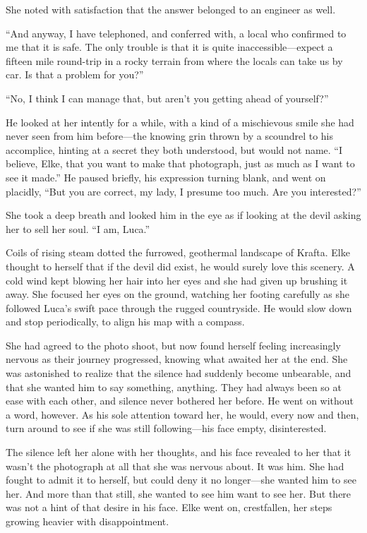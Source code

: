 She noted with satisfaction that the answer belonged to an engineer as well.

``And anyway, I have telephoned, and conferred with, a local who confirmed to me that it is safe. The only trouble is that it is quite inaccessible---expect a fifteen mile round-trip in a rocky terrain from where the locals can take us by car. Is that a problem for you?''

``No, I think I can manage that, but aren't you getting ahead of yourself?''

He looked at her intently for a while, with a kind of a mischievous smile she had never seen from him before---the knowing grin thrown by a scoundrel to his accomplice, hinting at a secret they both understood, but would not name. ``I believe, Elke, that you want to make that photograph, just as much as I want to see it made.'' He paused briefly, his expression turning blank, and went on placidly, ``But you are correct, my lady, I presume too much. Are you interested?''

She took a deep breath and looked him in the eye as if looking at the devil asking her to sell her soul. ``I am, Luca.''

\sectionline

Coils of rising steam dotted the furrowed, geothermal landscape of Krafta. Elke thought to herself that if the devil did exist, he would surely love this scenery. A cold wind kept blowing her hair into her eyes and she had given up brushing it away. She focused her eyes on the ground, watching her footing carefully as she followed Luca's swift pace through the rugged countryside. He would slow down and stop periodically, to align his map with a compass.

She had agreed to the photo shoot, but now found herself feeling increasingly nervous as their journey progressed, knowing what awaited her at the end. She was astonished to realize that the silence had suddenly become unbearable, and that she wanted him to say something, anything. They had always been so at ease with each other, and silence never bothered her before. He went on without a word, however. As his sole attention toward her, he would, every now and then, turn around to see if she was still following---his face empty, disinterested.

The silence left her alone with her thoughts, and his face revealed to her that it wasn't the photograph at all that she was nervous about. It was him. She had fought to admit it to herself, but could deny it no longer---she wanted him to see her. And more than that still, she wanted to see him want to see her. But there was not a hint of that desire in his face. Elke went on, crestfallen, her steps growing heavier with disappointment.

